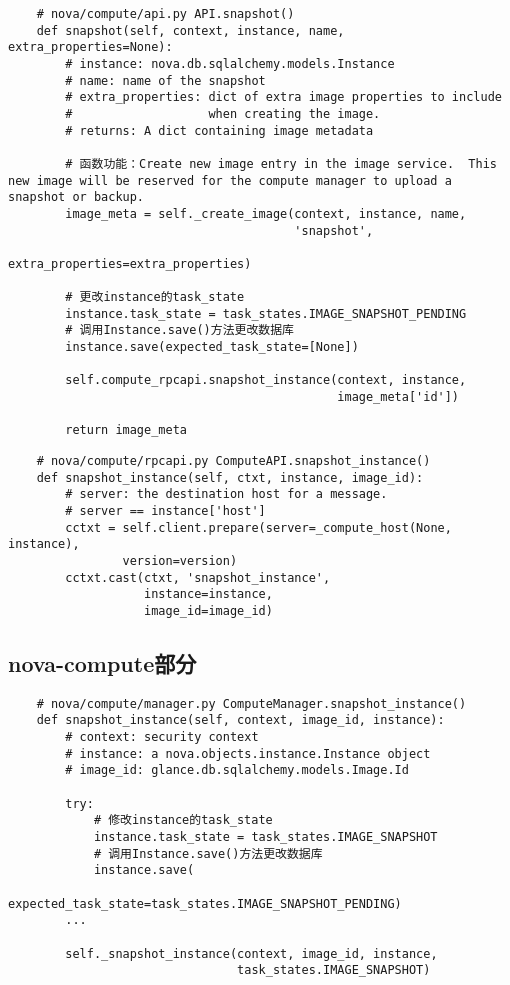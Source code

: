 \documentclass[a4paper,left=1.5cm,right=1.5cm,11pt]{article}
\begin{document}
    \begin{lstlisting}
    # nova/compute/api.py API.snapshot()
    def snapshot(self, context, instance, name, extra_properties=None):
        # instance: nova.db.sqlalchemy.models.Instance
        # name: name of the snapshot
        # extra_properties: dict of extra image properties to include
        #                   when creating the image.
        # returns: A dict containing image metadata

        # 函数功能：Create new image entry in the image service.  This new image will be reserved for the compute manager to upload a snapshot or backup.
        image_meta = self._create_image(context, instance, name,
                                        'snapshot',
                                        extra_properties=extra_properties)

        # 更改instance的task_state
        instance.task_state = task_states.IMAGE_SNAPSHOT_PENDING
        # 调用Instance.save()方法更改数据库
        instance.save(expected_task_state=[None])

        self.compute_rpcapi.snapshot_instance(context, instance,
                                              image_meta['id'])

        return image_meta
    \end{lstlisting}

    \begin{lstlisting}
    # nova/compute/rpcapi.py ComputeAPI.snapshot_instance()
    def snapshot_instance(self, ctxt, instance, image_id):
        # server: the destination host for a message.
        # server == instance['host']
        cctxt = self.client.prepare(server=_compute_host(None, instance),
                version=version)
        cctxt.cast(ctxt, 'snapshot_instance',
                   instance=instance,
                   image_id=image_id)
    \end{lstlisting}

\subsection{nova-compute部分}
    \begin{lstlisting}
    # nova/compute/manager.py ComputeManager.snapshot_instance()
    def snapshot_instance(self, context, image_id, instance):
        # context: security context
        # instance: a nova.objects.instance.Instance object
        # image_id: glance.db.sqlalchemy.models.Image.Id
        
        try:
            # 修改instance的task_state
            instance.task_state = task_states.IMAGE_SNAPSHOT
            # 调用Instance.save()方法更改数据库
            instance.save(
                        expected_task_state=task_states.IMAGE_SNAPSHOT_PENDING)
        ...

        self._snapshot_instance(context, image_id, instance,
                                task_states.IMAGE_SNAPSHOT)
    \end{lstlisting}
\end{document}
